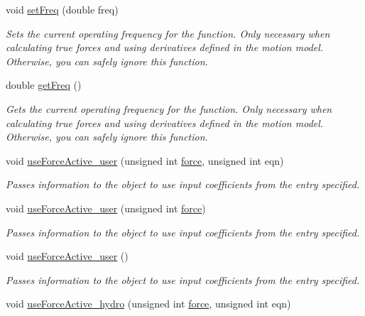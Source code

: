 \begin{DoxyCompactItemize}
void \hyperlink{classosea_1_1ofreq_1_1_motion_model_a18e880b4a0b1a1d1c385bc3be3524440}{set\-Freq} (double freq)
\begin{DoxyCompactList}\small\item\em Sets the current operating frequency for the function. Only necessary when calculating true forces and using derivatives defined in the motion model. Otherwise, you can safely ignore this function. \end{DoxyCompactList}\item 
double \hyperlink{classosea_1_1ofreq_1_1_motion_model_a3461ede3739b468b6bab3a05f94093cc}{get\-Freq} ()
\begin{DoxyCompactList}\small\item\em Gets the current operating frequency for the function. Only necessary when calculating true forces and using derivatives defined in the motion model. Otherwise, you can safely ignore this function. \end{DoxyCompactList}\item 
void \hyperlink{classosea_1_1ofreq_1_1_motion_model_aaf761fac4693612a10771e38993431a0}{use\-Force\-Active\-\_\-user} (unsigned int \hyperlink{input__syntax_8dox_ab0a92c70357da47fe86696522eab7dc8}{force}, unsigned int eqn)
\begin{DoxyCompactList}\small\item\em Passes information to the object to use input coefficients from the entry specified. \end{DoxyCompactList}\item 
void \hyperlink{classosea_1_1ofreq_1_1_motion_model_a6b402b9e9cfab05159732f38035434b5}{use\-Force\-Active\-\_\-user} (unsigned int \hyperlink{input__syntax_8dox_ab0a92c70357da47fe86696522eab7dc8}{force})
\begin{DoxyCompactList}\small\item\em Passes information to the object to use input coefficients from the entry specified. \end{DoxyCompactList}\item 
void \hyperlink{classosea_1_1ofreq_1_1_motion_model_a78243e9d9fd197b4675aad8b728de55e}{use\-Force\-Active\-\_\-user} ()
\begin{DoxyCompactList}\small\item\em Passes information to the object to use input coefficients from the entry specified. \end{DoxyCompactList}\item 
void \hyperlink{classosea_1_1ofreq_1_1_motion_model_a4d3e0590135e1a9f7ce954406f99ff44}{use\-Force\-Active\-\_\-hydro} (unsigned int \hyperlink{input__syntax_8dox_ab0a92c70357da47fe86696522eab7dc8}{force}, unsigned int eqn)

\end{DoxyCompactItemize}

